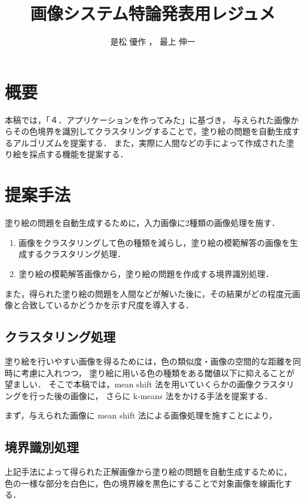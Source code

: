 \documentclass[dvipdfmx]{jsarticle}
\begin{document}
\title{画像システム特論発表用レジュメ}
\author{是松 優作 ， 最上 伸一}

\setlength{\baselineskip}{4.4mm}	%
\maketitle
\thispagestyle{empty}
\pagestyle{empty}

\section{概要}
本稿では，「４．アプリケーションを作ってみた」に基づき，
与えられた画像からその色境界を識別してクラスタリングすることで，塗り絵の問題を自動生成するアルゴリズムを提案する．
また，実際に人間などの手によって作成された塗り絵を採点する機能を提案する．

\section{提案手法}

塗り絵の問題を自動生成するために，入力画像に2種類の画像処理を施す．
\begin{enumerate}
\item 画像をクラスタリングして色の種類を減らし，塗り絵の模範解答の画像を生成する{\gtfamily クラスタリング処理}．
\item 塗り絵の模範解答画像から，塗り絵の問題を作成する{\gtfamily 境界識別処理}．
\end{enumerate}

また，得られた塗り絵の問題を人間などが解いた後に，その結果がどの程度元画像と合致しているかどうかを示す尺度を導入する．

\subsection{クラスタリング処理}
塗り絵を行いやすい画像を得るためには，色の類似度・画像の空間的な距離を同時に考慮に入れつつ，
塗り絵に用いる色の種類をある閾値以下に抑えることが望ましい．
そこで本稿では，mean shift 法を用いていくらかの画像クラスタリングを行った後の画像に，
さらに k-means 法をかける手法を提案する．

まず，与えられた画像に mean shift 法による画像処理を施すことにより，

\subsection{境界識別処理}
上記手法によって得られた正解画像から塗り絵の問題を自動生成するために，
色の一様な部分を白色に，色の境界線を黒色にすることで対象画像を線画化する．
\end{document}
